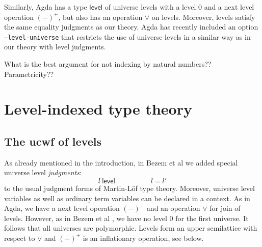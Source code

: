\documentclass[11pt,a4paper]{article}
\theoremstyle{plain}
\theoremstyle{definition}
\newcommand{\Level}{\mathsf{level}}
\newcommand{\level}{\mathsf{level}}
\begin{document}
Similarly, Agda has a type $\Level$ of universe levels with a level 0 and a next level operation $(-)^+$, but also has an operation $\vee$ on levels. Moreover, levels satisfy the same equality judgments as our theory. Agda has recently included an option {\tt --level-universe} that restricts the use of universe levels in a similar way as in our theory with level judgments.

What is the best argument for not indexing by natural numbers?? Parametricity??

\section{Level-indexed type theory}

\subsection{The ucwf of levels}\label{ucwf-levels}
 As already mentioned in the introduction, in Bezem et al \cite{BezemCDE22} we added special universe level {\em judgments}:
$$
l\ \level
\hspace{5em}
l = l'
$$
to the usual judgment forms of Martin-Löf type theory. Moreover, universe level variables as well as ordinary term variables can be declared in a context. As in Agda, we have a next level operation $(-)^+$ and an operation $\vee$ for join of levels. However, as in Bezem et al \cite{BezemCDE22}, we have no level 0 for the first universe. It follows that all universes are polymorphic.
Levels form an upper semilattice with respect to $\vee$ and $(-)^+$ is an inflationary operation, see below.

\end{document}
